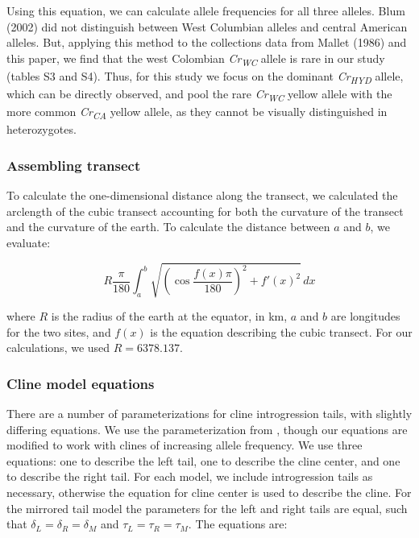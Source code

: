 \documentclass[]{article}
\begin{document}
Using this equation, we can calculate allele frequencies for all three
alleles. Blum (2002) did not distinguish between West Columbian alleles
and central American alleles. But, applying this method to the
collections data from Mallet (1986) and this paper, we find that the
west Colombian \textit{Cr\textsubscript{WC}} allele is rare in our study
(tables S3 and S4). Thus, for this study we focus on the dominant
\textit{Cr\textsubscript{HYD}} allele, which can be directly observed,
and pool the rare \textit{Cr\textsubscript{WC}} yellow allele with the
more common \textit{Cr\textsubscript{CA}} yellow allele, as they cannot
be visually distinguished in heterozygotes.

\subsubsection{Assembling transect}\label{assembling-transect}

To calculate the one-dimensional distance along the transect, we
calculated the arclength of the cubic transect accounting for both the
curvature of the transect and the curvature of the earth. To calculate
the distance between \(a\) and \(b\), we evaluate:

\begin{equation}
\label{eq:dist}
R\frac{\pi}{180}\int_{a}^{b}\sqrt{\left(\cos\frac{f(x)\pi}{180}\right)^2+
f'(x)^2}\,dx
\end{equation}

where \(R\) is the radius of the earth at the equator, in km, \(a\) and
\(b\) are longitudes for the two sites, and \(f(x)\) is the equation
describing the cubic transect. For our calculations, we used
\(R = 6378.137\).

\subsubsection{Cline model equations}\label{cline-model-equations}

There are a number of parameterizations for cline introgression tails,
with slightly differing equations. We use the parameterization from
\citet{Gay:2008jp}, though our equations are modified to work with
clines of increasing allele frequency. We use three equations: one to
describe the left tail, one to describe the cline center, and one to
describe the right tail. For each model, we include introgression tails
as necessary, otherwise the equation for cline center is used to
describe the cline. For the mirrored tail model the parameters for the
left and right tails are equal, such that
\(\delta_{L} = \delta_{R} = \delta_{M}\) and
\(\tau_{L} = \tau_{R} = \tau_{M}\). The equations are:
\end{document}
